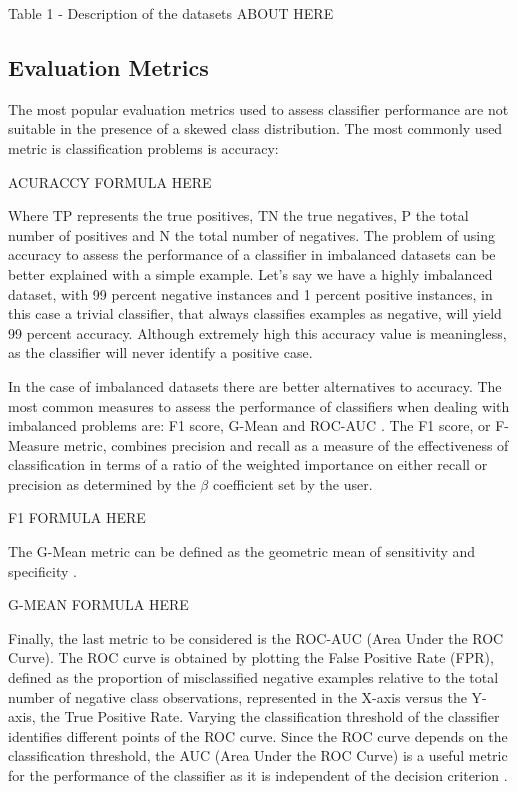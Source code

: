\documentclass[parskip=full]{scrartcl}
\begin{document}
Table 1 - Description of the datasets ABOUT HERE

\subsection{Evaluation Metrics}

The most popular evaluation metrics used to assess classifier performance are 
not suitable in the presence of a skewed class distribution. The most commonly 
used metric is classification problems is accuracy:

ACURACCY FORMULA HERE

Where TP represents the true positives, TN the true negatives, P the total 
number of positives and N the total number of negatives. The problem of using 
accuracy to assess the performance of a classifier in imbalanced datasets can 
be better explained with a simple example. Let’s say we have a highly 
imbalanced dataset, with 99 percent negative instances and 1 percent positive 
instances, in this case a trivial classifier, that always classifies examples 
as negative, will yield 99 percent accuracy. Although extremely high this 
accuracy value is meaningless, as the classifier will never identify a positive 
case.

In the case of imbalanced datasets there are better alternatives to accuracy. 
The most common measures to assess the performance of classifiers when dealing 
with imbalanced problems are: F1 score, G-Mean and ROC-AUC \cite{He2009}. The 
F1 score, or F-Measure metric, combines precision and recall as a measure of 
the effectiveness of classification in terms of a ratio of the weighted 
importance on either recall or precision as determined by the $\beta$ coefficient set by the user.

F1 FORMULA HERE

The G-Mean metric can be defined as the geometric mean of sensitivity and 
specificity \cite{He2009}.

G-MEAN FORMULA HERE

Finally, the last metric to be considered is the ROC-AUC (Area Under the ROC 
Curve). The ROC curve is obtained by plotting the False Positive Rate (FPR), 
defined as the proportion of misclassified negative examples relative to the 
total number of negative class observations, represented in the X-axis versus 
the Y-axis, the True Positive Rate. Varying the classification threshold of the 
classifier identifies different points of the ROC curve. Since the ROC curve 
depends on the classification threshold, the AUC (Area Under the ROC Curve) is 
a useful metric for the performance of the classifier as it is independent of 
the decision criterion \cite{He2009}.
\end{document}
